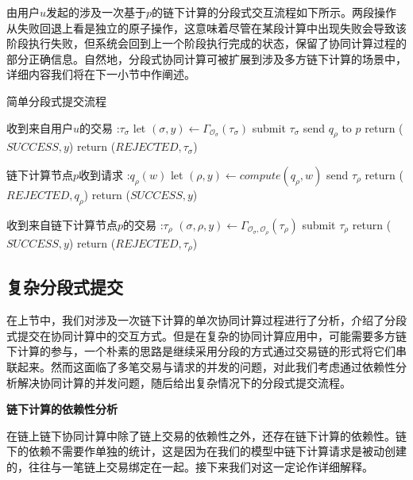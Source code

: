 由用户$u$发起的涉及一次基于$p$的链下计算的分段式交互流程如下所示。两段操作从失败回退上看是独立的原子操作，这意味着尽管在某段计算中出现失败会导致该阶段执行失败，但系统会回到上一个阶段执行完成的状态，保留了协同计算过程的部分正确信息。自然地，分段式协同计算可被扩展到涉及多方链下计算的场景中，详细内容我们将在下一小节中作阐述。

\begin{breakablealgorithm}
    \caption{简单分段式提交流程}
    \label{alg:ch3-7}
    \begin{algorithmic} 
        \item[收到来自用户$u$的交易]:$\tau_\sigma$
        \STATE let $(\sigma, y) \leftarrow \Gamma_{\mathcal{O}_\sigma}(\tau_\sigma)$
        \IF {$\sigma \neq \perp$}
        \STATE submit $\tau_\sigma$
        \STATE send $q_\rho$ to $p$
        \STATE return ($SUCCESS, y$)
        \ENDIF
        \STATE return ($REJECTED, \tau_\sigma$)
        \item[链下计算节点$p$收到请求]:$q_\rho(w)$
        \STATE let $(\rho, y) \leftarrow compute(q_\rho, w)$
        \IF {$\rho \neq \perp$} 
        \STATE send $\tau_\rho$
        \STATE return ($REJECTED, q_\rho$)
        \ENDIF
        \STATE return ($SUCCESS, y$)
        \item[收到来自链下计算节点$p$的交易]:$\tau_\rho$
        \STATE $(\sigma, \rho, y) \leftarrow \Gamma_{\mathcal{O}_\sigma, \mathcal{O}_\rho}(\tau_\rho)$
        \IF {$\sigma \neq \perp$}
        \STATE submit $\tau_\rho$
        \STATE return ($SUCCESS, y$)
        \ENDIF
        \STATE return ($REJECTED, \tau_\rho$)
    \end{algorithmic}
\end{breakablealgorithm}

\subsection{复杂分段式提交}
在上节中，我们对涉及一次链下计算的单次协同计算过程进行了分析，介绍了分段式提交在协同计算中的交互方式。但是在复杂的协同计算应用中，可能需要多方链下计算的参与，一个朴素的思路是继续采用分段的方式通过交易链的形式将它们串联起来。然而这面临了多笔交易与请求的并发的问题，对此我们考虑通过依赖性分析解决协同计算的并发问题，随后给出复杂情况下的分段式提交流程。

\noindent\textbf{链下计算的依赖性分析}

在链上链下协同计算中除了链上交易的依赖性之外，还存在链下计算的依赖性。链下的依赖不需要作单独的统计，这是因为在我们的模型中链下计算请求是被动创建的，往往与一笔链上交易绑定在一起。接下来我们对这一定论作详细解释。

